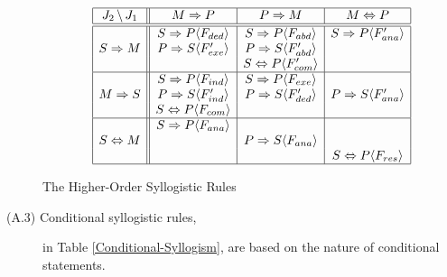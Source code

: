\begin{description}
\begin{table}[htb]
\[\begin{array}{|c||c|c|c|} \hline
J_2 \, \backslash \, J_1 & M \Rightarrow P & P \Rightarrow M & M \Leftrightarrow P \\
\hline \hline
                & S \Rightarrow P \langle F_{ded}\rangle  & S \Rightarrow P \langle F_{abd}\rangle  & S \Rightarrow P \langle F'_{ana}\rangle  \\
S \Rightarrow M & P \Rightarrow S \langle F'_{exe}\rangle  & P \Rightarrow S \langle F'_{abd}\rangle  &  \\
                & & S \Leftrightarrow P \langle F'_{com}\rangle  &  \\
\hline
                & S \Rightarrow P \langle F_{ind}\rangle  & S \Rightarrow P \langle F_{exe}\rangle  & \\
M \Rightarrow S & P \Rightarrow S \langle F'_{ind}\rangle  & P \Rightarrow S \langle F'_{ded}\rangle  & P \Rightarrow S \langle F'_{ana}\rangle  \\
                & S \Leftrightarrow P \langle F_{com}\rangle  &  &  \\
\hline
                    & S \Rightarrow P \langle F_{ana}\rangle  &  &  \\
S \Leftrightarrow M &  & P \Rightarrow S \langle F_{ana}\rangle  &  \\
                    &  &  & S \Leftrightarrow P \langle F_{res}\rangle  \\
\hline \end{array}\]
\caption{The Higher-Order Syllogistic Rules}
\label{Higher-Order-Syllogism}
\end{table}

  \item[(A.3) Conditional syllogistic rules,]  in Table \ref{Conditional-Syllogism}, are based on the nature of conditional statements. 


\end{description}
